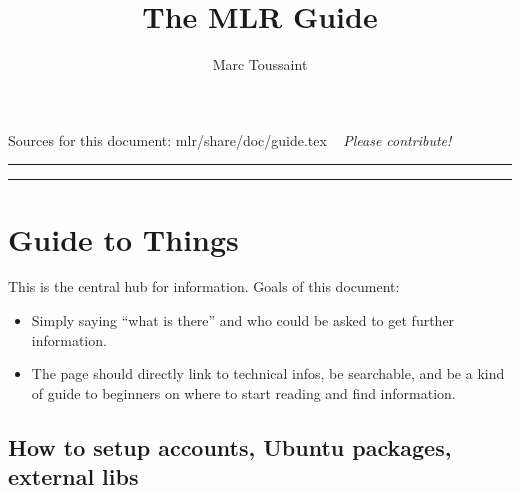 
 
\title{The MLR Guide}
\author{Marc Toussaint}


\maketitle

\centerline{Sources for this document: mlr/share/doc/guide.tex ~ \emph{Please contribute!}}

{\bigskip\hrule\vspace*{-2ex}\small\tableofcontents\medskip\hrule}

\section{Guide to Things}

This is the central hub for information. Goals of this document:
\begin{itemize}
\item Simply saying ``what is there'' and who could be asked to get further information.

\item The page should directly link to technical infos, be searchable, and be a kind of guide to beginners on where to start reading and find information.
\end{itemize}


\subsection{How to setup accounts, Ubuntu packages, external libs}

